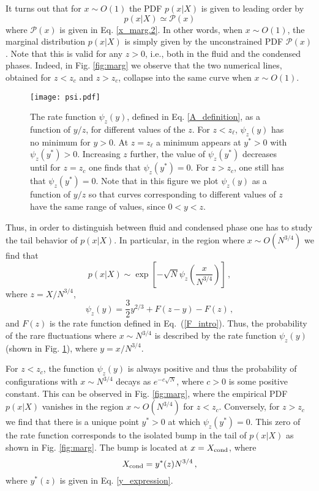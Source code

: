 \documentclass[aps,pre,twocolumn,superscriptaddress,showpacs]{revtex4-1}
\newcommand{\be}{\begin{equation}}
\newcommand{\ee}{\end{equation}}
\newcommand{\mP}{\mathcal{P}}
\begin{document}
It turns out that for $x\sim O(1)$ the PDF $p(x|X)$ is given to leading order by
\be 
p(x|X)\simeq \mP (x)
\ee
where $\mP(x)$ is given in Eq. \eqref{x_marg.2}. In other words, when $x\sim O(1)$, the marginal distribution $p(x|X)$ is simply given by the unconstrained PDF $\mP(x)$. Note that this is valid for any $z>0$, i.e., both in the fluid and the condensed phases. Indeed, in Fig. \ref{fig:marg} we observe that the two numerical lines, obtained for $z<z_c$ and $z>z_c$, collapse into the same curve when $x\sim O(1)$.


\begin{figure}
\texttt{[image: psi.pdf]}
\caption{The rate function $\psi_z(y)$, defined in Eq. \eqref{A_definition}, as a function of $y/z$, for different values of the $z$. For $z<z_{\ell}$, $\psi_z(y)$ has no minimum for $y>0$. At $z=z_{\ell}$ a minimum appears at $y^*>0$ with $\psi_z(y^*)>0$. Increasing $z$ further, the value of $\psi_z(y^*)$ decreases until for $z=z_c$ one finds that $\psi_z(y^*)=0$. For $z>z_c$, one still has that $\psi_z(y^*)=0$. Note that in this figure we plot $\psi_z(y)$ as a function of $y/z$ so that curves corresponding to different values of $z$ have the same range of values, since $0<y<z$.}
\label{fig:A}
\end{figure}


Thus, in order to distinguish between fluid and condensed phase one has to study the tail behavior of $p(x|X)$. In particular, in the region where $x\sim O(N^{3/4})$ we find that
\begin{equation}
p(x|X)\sim 
\exp\left[-\sqrt{N}\psi_z\left(\frac{x}{ N^{3/4}}\right)\right]\,,
\end{equation}
where $z=X/ N^{3/4}$,
\begin{equation}
\psi_z(y)=\frac32 y^{2/3}+F(z-y)-F(z)\,,
\end{equation}
and $F(z)$ is the rate function defined in Eq.~(\ref{F_intro}).
Thus, the probability of the rare fluctuations where $x\sim N^{3/4}$ is described by the rate function $\psi_z(y)$ (shown in Fig. \ref{fig:A}), where $y=x/N^{3/4}$.

For $z<z_c$, the function $\psi_z(y)$ is always positive and thus the probability of configurations with $x\sim N^{3/4}$ decays as $e^{-c\sqrt{N}}$, where $c>0$ is some positive constant. This can be observed in Fig. \ref{fig:marg}, where the empirical PDF $p(x|X)$ vanishes in the region $x\sim O(N^{3/4})$ for $z<z_c$. Conversely, for $z>z_c$ we find that there is a unique point $y^*>0$ at which $\psi_z(y^*)=0$. This zero of the rate function corresponds to the isolated bump in the tail of $p(x|X)$ as shown in Fig. \ref{fig:marg}. The bump is located at $x=X_{\rm cond}$, where
\be 
X_{\rm cond}=y^*(z) N^{3/4}\,,
\label{Xcond}
\ee 
where $y^*(z)$  is given in Eq. \eqref{y_expression}.
\end{document}
